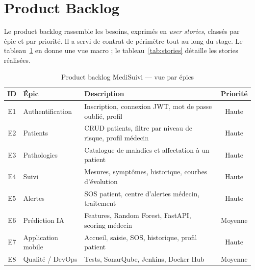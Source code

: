 \documentclass[12pt,a4paper,oneside]{report}
\begin{document}
\section{Product Backlog}
\label{sec:backlog}

Le product backlog rassemble les besoins, exprimés en \emph{user stories}, classés par épic et par priorité. Il a servi de contrat de périmètre tout au long du stage. Le tableau~\ref{tab:backlog} en donne une vue macro ; le tableau~\ref{tab:stories} détaille les stories réalisées.

\begin{table}[htbp]
\centering
\begin{tabular}{@{}clp{7.6cm}c@{}}
\toprule
\textbf{ID} & \textbf{Épic} & \textbf{Description} & \textbf{Priorité} \\
\midrule
E1 & Authentification & Inscription, connexion JWT, mot de passe oublié, profil & Haute \\
E2 & Patients        & CRUD patients, filtre par niveau de risque, profil médecin & Haute \\
E3 & Pathologies     & Catalogue de maladies et affectation à un patient & Haute \\
E4 & Suivi           & Mesures, symptômes, historique, courbes d'évolution & Haute \\
E5 & Alertes         & SOS patient, centre d'alertes médecin, traitement & Haute \\
E6 & Prédiction IA   & Features, Random Forest, FastAPI, scoring médecin & Moyenne \\
E7 & Application mobile & Accueil, saisie, SOS, historique, profil patient & Haute \\
E8 & Qualité / DevOps & Tests, SonarQube, Jenkins, Docker Hub & Moyenne \\
\bottomrule
\end{tabular}
\caption{Product backlog MediSuivi --- vue par épics}
\label{tab:backlog}
\end{table}
\end{document}
